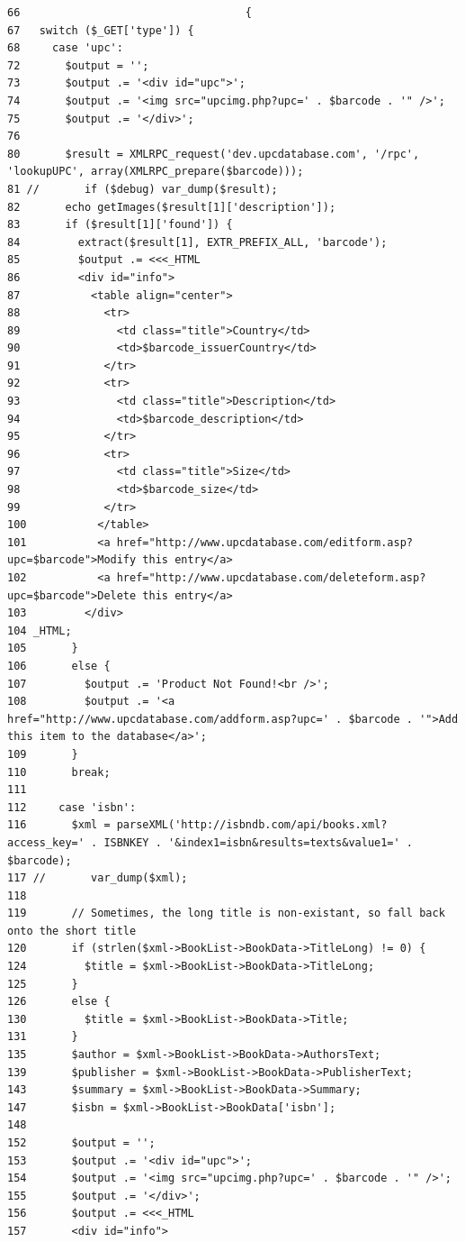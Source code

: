 \begin{Code}\begin{verbatim}66                                   {
67   switch ($_GET['type']) {
68     case 'upc':
72       $output = '';
73       $output .= '<div id="upc">';
74       $output .= '<img src="upcimg.php?upc=' . $barcode . '" />';
75       $output .= '</div>';
76 
80       $result = XMLRPC_request('dev.upcdatabase.com', '/rpc', 'lookupUPC', array(XMLRPC_prepare($barcode)));
81 //       if ($debug) var_dump($result);
82       echo getImages($result[1]['description']);
83       if ($result[1]['found']) {
84         extract($result[1], EXTR_PREFIX_ALL, 'barcode');
85         $output .= <<<_HTML
86         <div id="info">
87           <table align="center">
88             <tr>
89               <td class="title">Country</td>
90               <td>$barcode_issuerCountry</td>
91             </tr>
92             <tr>
93               <td class="title">Description</td>
94               <td>$barcode_description</td>
95             </tr>
96             <tr>
97               <td class="title">Size</td>
98               <td>$barcode_size</td>
99             </tr>
100           </table>
101           <a href="http://www.upcdatabase.com/editform.asp?upc=$barcode">Modify this entry</a>
102           <a href="http://www.upcdatabase.com/deleteform.asp?upc=$barcode">Delete this entry</a>
103         </div>
104 _HTML;
105       }
106       else {
107         $output .= 'Product Not Found!<br />';
108         $output .= '<a href="http://www.upcdatabase.com/addform.asp?upc=' . $barcode . '">Add this item to the database</a>';
109       }
110       break;
111 
112     case 'isbn':
116       $xml = parseXML('http://isbndb.com/api/books.xml?access_key=' . ISBNKEY . '&index1=isbn&results=texts&value1=' . $barcode);
117 //       var_dump($xml);
118 
119       // Sometimes, the long title is non-existant, so fall back onto the short title
120       if (strlen($xml->BookList->BookData->TitleLong) != 0) {
124         $title = $xml->BookList->BookData->TitleLong;
125       }
126       else {
130         $title = $xml->BookList->BookData->Title;
131       }
135       $author = $xml->BookList->BookData->AuthorsText;
139       $publisher = $xml->BookList->BookData->PublisherText;
143       $summary = $xml->BookList->BookData->Summary;
147       $isbn = $xml->BookList->BookData['isbn'];
148 
152       $output = '';
153       $output .= '<div id="upc">';
154       $output .= '<img src="upcimg.php?upc=' . $barcode . '" />';
155       $output .= '</div>';
156       $output .= <<<_HTML
157       <div id="info">

\end{verbatim}
\end{Code}
